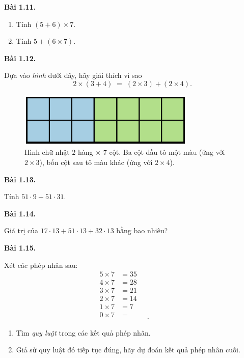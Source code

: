 \documentclass[14pt,a4paper]{extbook}
\newenvironment{problem}[1][]{
  \par\noindent\textbf{Bài #1.}\ \ignorespaces
}{\par}
\begin{document}
\begin{problem}[1.11]
\begin{enumerate}[label=(\alph*)]
  \item Tính \((5+6)\times7\).
  \item Tính \(5+(6\times7)\).
\end{enumerate}
\end{problem}


\begin{problem}[1.12]
Dựa vào \emph{hình} dưới đây, hãy giải thích vì sao
\[
2\times(3+4) \;=\; (2\times3) + (2\times4).
\]

\begin{figure}[ht!]
  \centering
  \includegraphics[width=0.75\textwidth]{img/fig-prob1.12.pdf}
  \caption*{\small Hình chữ nhật \(2\) hàng \(\times\) \(7\) cột.
  Ba cột đầu tô một màu (ứng với \(2\times3\)),
  bốn cột sau tô màu khác (ứng với \(2\times4\)).}
\end{figure}
\end{problem}

\begin{problem}[1.13]
Tính \(51\cdot9 + 51\cdot31\).
\end{problem}

\begin{problem}[1.14]
Giá trị của \(17\cdot13 + 51\cdot13 + 32\cdot13\) bằng bao nhiêu?
\end{problem}

\begin{problem}[1.15]
Xét các phép nhân sau:
\[
\begin{aligned}
5\times 7 &= 35\\
4\times 7 &= 28\\
3\times 7 &= 21\\
2\times 7 &= 14\\
1\times 7 &= 7\\
0\times 7 &=\ \underline{\hspace{2cm}}
\end{aligned}
\]
\begin{enumerate}[label=(\alph*)]
  \item Tìm \emph{quy luật} trong các kết quả phép nhân.
  \item Giả sử quy luật đó tiếp tục đúng, hãy dự đoán kết quả phép nhân cuối.
\end{enumerate}
\end{problem}
\end{document}
